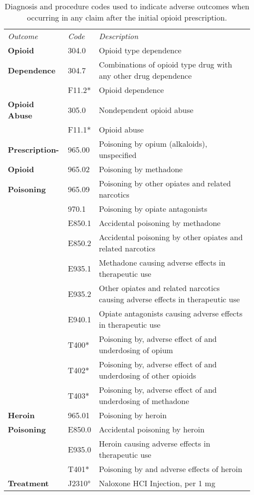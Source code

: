 \documentclass[9pt,twoside]{pnas-new}
\begin{document}
\begin{table}
\caption{Diagnosis and procedure codes used to indicate adverse outcomes when occurring in any claim after the initial opioid prescription.}
\centering
\begin{tabular}{lll}
\em Outcome & \em Code & \em Description \\[0.5em]
\textbf{Opioid} & 304.0 & Opioid type dependence \\
\textbf{Dependence} & 304.7 & Combinations of opioid type drug with any other drug dependence \\
 & F11.2* & Opioid dependence \\[0.5em]
\textbf{Opioid Abuse} & 305.0 & Nondependent opioid abuse  \\
 & F11.1* & Opioid abuse \\[0.5em]
\textbf{Prescription-} & 965.00 & Poisoning by opium (alkaloids), unspecified \\
\textbf{Opioid} & 965.02 & Poisoning by methadone \\
\textbf{Poisoning} & 965.09 & Poisoning by other opiates and related narcotics \\
 & 970.1 & Poisoning by opiate antagonists \\
 & E850.1 & Accidental poisoning by methadone \\
 & E850.2 & Accidental poisoning by other opiates and related narcotics \\
 & E935.1 & Methadone causing adverse effects in therapeutic use \\
 & E935.2 & Other opiates and related narcotics causing adverse effects in therapeutic use \\
 & E940.1 & Opiate antagonists causing adverse effects in therapeutic use \\
 & T400* & Poisoning by, adverse effect of and underdosing of opium \\
 & T402* & Poisoning by, adverse effect of and underdosing of other opioids \\
 & T403* & Poisoning by, adverse effect of and underdosing of methadone \\[0.5em]
\textbf{Heroin} & 965.01 & Poisoning by heroin \\
\textbf{Poisoning} & E850.0 & Accidental poisoning by heroin \\
 & E935.0 & Heroin causing adverse effects in therapeutic use \\
 & T401* & Poisoning by and adverse effects of heroin \\[0.5em]
\textbf{Treatment} & J2310° & Naloxone HCI Injection, per 1 mg \\

\end{tabular}
\end{table}
\end{document}
